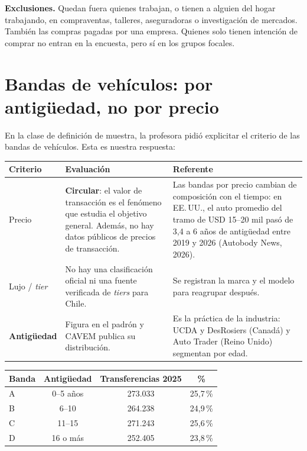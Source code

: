 \documentclass[11pt,a4paper]{article}
\begin{document}
\textbf{Exclusiones.} Quedan fuera quienes trabajan, o tienen a alguien del hogar trabajando, en compraventas, talleres, aseguradoras o investigación de mercados. También las compras pagadas por una empresa. Quienes solo tienen intención de comprar no entran en la encuesta, pero sí en los grupos focales.

\section{Bandas de vehículos: por antigüedad, no por precio}\label{sec:bandas}

En la clase de definición de muestra, la profesora pidió explicitar el criterio de las bandas de vehículos. Esta es nuestra respuesta:

\begin{center}\small
\begin{tabularx}{\textwidth}{@{}p{2.1cm}LL@{}}
\toprule
\textbf{Criterio} & \textbf{Evaluación} & \textbf{Referente}\\
\midrule
Precio & \textbf{Circular}: el valor de transacción es el fenómeno que estudia el objetivo general. Además, no hay datos públicos de precios de transacción. & Las bandas por precio cambian de composición con el tiempo: en EE.\,UU., el auto promedio del tramo de USD 15–20 mil pasó de 3,4 a 6 años de antigüedad entre 2019 y 2026 (Autobody News, 2026). \\
Lujo / \emph{tier} & No hay una clasificación oficial ni una fuente verificada de \emph{tiers} para Chile. & Se registran la marca y el modelo para reagrupar después. \\
\textbf{Antigüedad} & Figura en el padrón y CAVEM publica su distribución. & Es la práctica de la industria: UCDA y DesRosiers (Canadá) y Auto Trader (Reino Unido) segmentan por edad. \\
\bottomrule
\end{tabularx}
\end{center}

\begin{center}\small
\begin{tabularx}{\textwidth}{@{}lCCC@{}}
\toprule
\textbf{Banda} & \textbf{Antigüedad} & \textbf{Transferencias 2025} & \textbf{\%}\\
\midrule
A & 0–5 años & 273.033 & 25,7\,\%\\
B & 6–10 & 264.238 & 24,9\,\%\\
C & 11–15 & 271.243 & 25,6\,\%\\
D & 16 o más & 252.405 & 23,8\,\%\\
\bottomrule
\end{tabularx}
\end{center}
\end{document}
